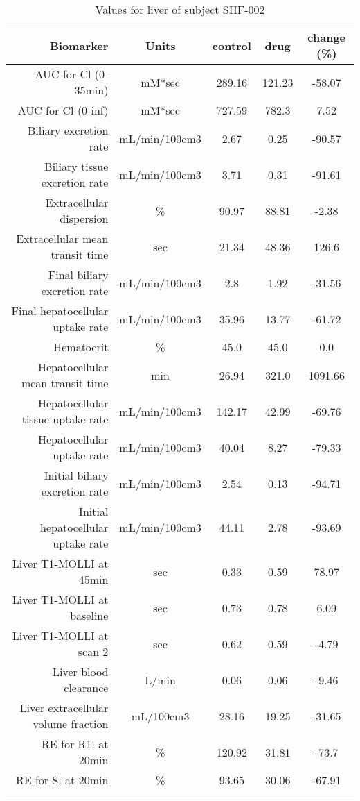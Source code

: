 \documentclass{epflreport}%
\begin{document}
%
\clearpage%
\begin{longtable}{rcccc}%
\hline%
Biomarker&Units&control&drug&change (\%)\\%
\hline%
AUC for Cl (0{-}35min)&mM*sec&289.16&121.23&{-}58.07\\%
AUC for Cl (0{-}inf)&mM*sec&727.59&782.3&7.52\\%
Biliary excretion rate&mL/min/100cm3&2.67&0.25&{-}90.57\\%
Biliary tissue excretion rate&mL/min/100cm3&3.71&0.31&{-}91.61\\%
Extracellular dispersion&\%&90.97&88.81&{-}2.38\\%
Extracellular mean transit time&sec&21.34&48.36&126.6\\%
Final biliary excretion rate&mL/min/100cm3&2.8&1.92&{-}31.56\\%
Final hepatocellular uptake rate&mL/min/100cm3&35.96&13.77&{-}61.72\\%
Hematocrit&\%&45.0&45.0&0.0\\%
Hepatocellular mean transit time&min&26.94&321.0&1091.66\\%
Hepatocellular tissue uptake rate&mL/min/100cm3&142.17&42.99&{-}69.76\\%
Hepatocellular uptake rate&mL/min/100cm3&40.04&8.27&{-}79.33\\%
Initial biliary excretion rate&mL/min/100cm3&2.54&0.13&{-}94.71\\%
Initial hepatocellular uptake rate&mL/min/100cm3&44.11&2.78&{-}93.69\\%
Liver T1{-}MOLLI at 45min&sec&0.33&0.59&78.97\\%
Liver T1{-}MOLLI at baseline&sec&0.73&0.78&6.09\\%
Liver T1{-}MOLLI at scan 2&sec&0.62&0.59&{-}4.79\\%
Liver blood clearance&L/min&0.06&0.06&{-}9.46\\%
Liver extracellular volume fraction&mL/100cm3&28.16&19.25&{-}31.65\\%
RE for R1l at 20min&\%&120.92&31.81&{-}73.7\\%
RE for Sl at 20min&\%&93.65&30.06&{-}67.91\\%
\hline%
\caption{Values for liver of subject SHF-002} \\%
\end{longtable}%
\end{document}
